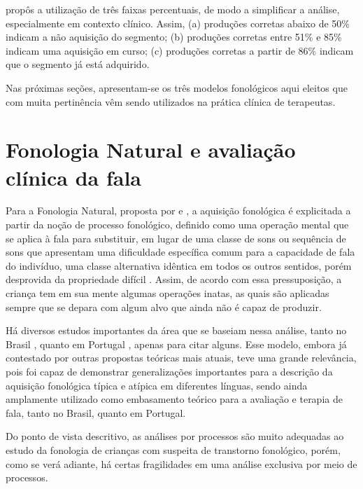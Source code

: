\documentclass[output=paper,colorlinks,citecolor=brown,booklanguage=portuguese]{langscibook}
\begin{document}
\citet{LazzarottoVolcao2014} propôs a utilização de três faixas percentuais, de modo a simplificar a análise, especialmente em contexto clínico. Assim, (a) produções corretas abaixo de 50\% indicam a não aquisição do segmento; (b) produções corretas entre 51\% e 85\% indicam uma aquisição em curso; (c) produções corretas a partir de 86\% indicam que o segmento já está adquirido. 

Nas próximas seções, apresentam-se os três modelos fonológicos aqui eleitos que com muita pertinência vêm sendo utilizados na prática clínica de terapeutas.

\section{Fonologia Natural e avaliação clínica da fala }



Para a Fonologia Natural, proposta por \citet{Stampe1973} e \citet{Stampe1979}, a aquisição fonológica é explicitada a partir da noção de processo fonológico, definido como uma operação mental que se aplica à fala para substituir, em lugar de uma classe de sons ou sequência de sons que apresentam uma dificuldade específica comum para a capacidade de fala do indivíduo, uma classe alternativa idêntica em todos os outros sentidos, porém desprovida da propriedade difícil \citep[1]{Stampe1973}. Assim, de acordo com essa pressuposição, a criança tem em sua mente algumas operações inatas, as quais são aplicadas sempre que se depara com algum alvo que ainda não é capaz de produzir. 

Há diversos estudos importantes da área que se baseiam nessa análise, tanto no Brasil \citep{Lamprecht1990}, quanto em Portugal \citep{Lousada2012}, apenas para citar alguns. Esse modelo, embora já contestado por outras propostas teóricas mais atuais, teve uma grande relevância, pois foi capaz de demonstrar generalizações importantes para a descrição da aquisição fonológica típica e atípica em diferentes línguas, sendo ainda amplamente utilizado como embasamento teórico para a avaliação e terapia de fala, tanto no Brasil, quanto em Portugal.





Do ponto de vista descritivo, as análises por processos são muito adequadas ao estudo da fonologia de crianças com suspeita de transtorno fonológico, porém, como se verá adiante, há certas fragilidades em uma análise exclusiva por meio de processos. 
\end{document}
